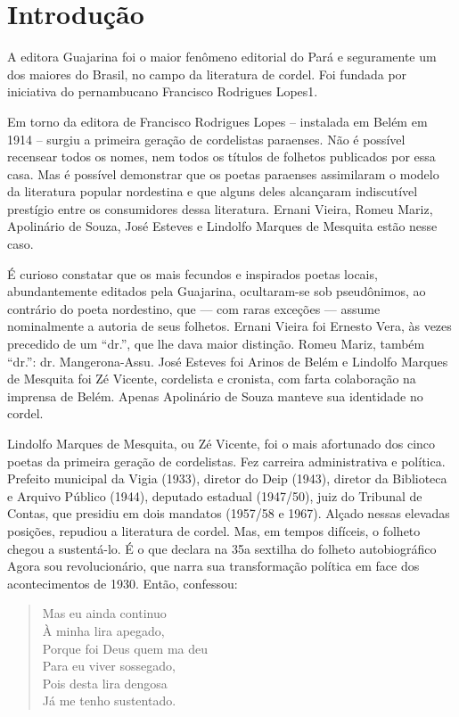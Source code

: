 \chapter[Introdução, por Vicente Salles]{Introdução}

A editora Guajarina foi o maior fenômeno editorial do Pará e
seguramente um dos maiores do Brasil, no campo da literatura de
cordel. Foi fundada por iniciativa do pernambucano Francisco
Rodrigues Lopes1.

Em torno da editora de Francisco Rodrigues Lopes – instalada em Belém
em 1914 – surgiu a primeira geração de cordelistas paraenses. Não é
possível recensear todos os nomes, nem todos os títulos de folhetos
publicados por essa casa. Mas é possível demonstrar que os poetas
paraenses assimilaram o modelo da literatura popular nordestina e que
alguns deles alcançaram indiscutível prestígio entre os consumidores
dessa literatura. Ernani Vieira, Romeu Mariz, Apolinário de Souza,
José Esteves e Lindolfo Marques de Mesquita estão nesse caso.

 É curioso constatar que os mais fecundos e inspirados poetas locais,
abundantemente editados pela Guajarina, ocultaram-se sob pseudônimos,
ao contrário do poeta nordestino, que — com raras exceções — assume
nominalmente a autoria de seus folhetos. Ernani Vieira foi Ernesto
Vera, às vezes precedido de um “dr.”, que lhe dava maior distinção.
Romeu Mariz, também “dr.”: dr. Mangerona-Assu. José Esteves foi
Arinos de Belém e Lindolfo Marques de Mesquita foi Zé Vicente,
cordelista e cronista, com farta colaboração na imprensa de Belém.
Apenas Apolinário de Souza manteve sua identidade no cordel.

Lindolfo Marques de Mesquita, ou Zé Vicente, foi o mais afortunado dos
cinco poetas da primeira geração de cordelistas. Fez carreira
administrativa e política. Prefeito municipal da Vigia (1933),
diretor do Deip (1943), diretor da Biblioteca e Arquivo Público
(1944), deputado estadual (1947/50), juiz do Tribunal de Contas, que
presidiu em dois mandatos (1957/58 e 1967). Alçado nessas elevadas
posições, repudiou a literatura de cordel. Mas, em tempos difíceis, o
folheto chegou a sustentá-lo. É o que declara na 35a sextilha do
folheto autobiográfico Agora sou revolucionário, que narra sua
transformação política em face dos acontecimentos de 1930. Então,
confessou:

\begin{verse}
Mas eu ainda continuo\\
À minha lira apegado,\\
Porque foi Deus quem ma deu\\
Para eu viver sossegado,\\
Pois desta lira dengosa\\
Já me tenho sustentado.
\end{verse}

